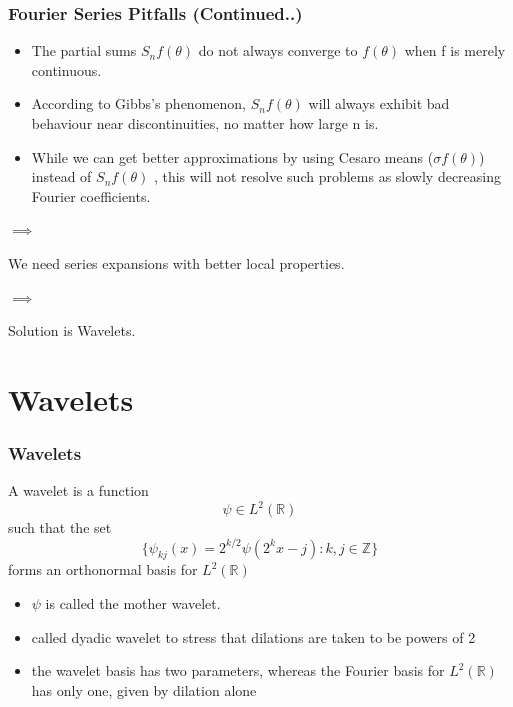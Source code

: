 \documentclass{beamer}
\begin{document}
\begin{frame}
    \frametitle{Fourier Series Pitfalls (Continued..)}
    
    \begin{itemize}
        \item The partial sums $S_n f (\theta )$ do not always converge to $f (\theta )$ when f is merely continuous.
        \item According to Gibbs’s phenomenon, $S_n f (\theta )$ will always exhibit bad behaviour near discontinuities, no matter how large n is.
        \item While we can get better approximations by using Cesaro means ($\sigma f (\theta )$) instead of $S_n f (\theta )$ , this will not resolve such problems as
        slowly decreasing Fourier coefficients.
    \end{itemize}
    $\implies$

    \begin{center}
        We need series expansions with better local properties.     
    \end{center}
    
    $\implies$

    \begin{center}
        Solution is Wavelets.
    \end{center}
    

    \end{frame}

    

\section{Wavelets} %

\begin{frame}
\frametitle{Wavelets}
\begin{definition}[15.1.1]
    A wavelet is a function $$\psi \in L^2 \left({\mathbb{R}}\right)$$ such that the set
    $$\{\psi_{kj}(x) = 2^{k/2}\psi(2^kx-j): k,j \in \mathbb{Z} \}$$
    forms an orthonormal basis for $L^2\left({\mathbb{R}}\right)$
\end{definition}

\begin{itemize}
\item $\psi$ is called the mother wavelet.
\item called dyadic wavelet to stress that dilations are taken to be powers of 2
\item the wavelet basis has two parameters, whereas the Fourier basis for $L^2\left({\mathbb{R}}\right)$  has only one, given by dilation alone
\end{itemize}

\end{frame}
\end{document}
